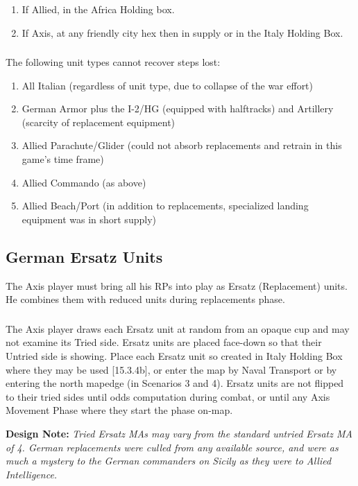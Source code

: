 \begin{enumerate}[label=\alph*.]
    \item If Allied, in the Africa Holding box.
    \item If Axis, at any friendly city hex then in supply or in the Italy Holding Box.
\end{enumerate}

\subsubsection{} The following unit types cannot recover steps lost:
\begin{enumerate}[label=\alph*.]
    \item All Italian (regardless of unit type, due to collapse of the war effort)
    \item German Armor plus the I-2/HG (equipped with halftracks) and Artillery (scarcity of replacement equipment)
    \item Allied Parachute/Glider (could not absorb replacements and retrain in this game's time frame)
    \item Allied Commando (as above)
    \item Allied Beach/Port (in addition to replacements, specialized landing equipment was in short supply)
\end{enumerate}

\subsection{German Ersatz Units}

The Axis player must bring all his RPs into play as Ersatz (Replacement) units. He combines them with reduced units during replacements phase.

\subsubsection{} The Axis player draws each Ersatz unit at random from an opaque cup and may not examine its Tried side. Ersatz units are placed face-down so that their Untried side is showing. Place each Ersatz unit so created in Italy Holding Box where they may be used [15.3.4b], or enter the map by Naval Transport or by entering the north mapedge (in Scenarios 3 and 4). Ersatz units are not flipped to their tried sides until odds computation during combat, or until any Axis Movement Phase where they start the phase on-map.

\textbf{Design Note:} \textit{Tried Ersatz MAs may vary from the standard untried Ersatz MA of 4. German replacements were culled from any available source, and were as much a mystery to the German commanders on Sicily as they were to Allied Intelligence.}


